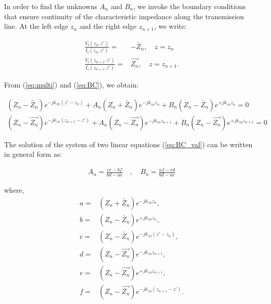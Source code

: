 \documentclass[11pt]{article}
\renewcommand{\^}{\hat}  %
\begin{document}
    In order to find the unknowns $A_n$ and $B_n$, we invoke the boundary conditions that ensure continuity of the characteristic impedance along the transmission line. At the left edge $z_n$ and the right edge $z_{n+1}$, we write:

    \begin{subequations}
      \begin{align}
        \frac{V_i(z_n,z')}{I_i(z_n,z')} ={}& -\overleftarrow{Z_n} , \quad z = z_n
        \label{eq:BC_left}\\
        \frac{V_i(z_{n+1},z')}{I_i(z_{n+1},z')} ={}& \overrightarrow{Z_n} ,\quad  z = z_{n+1}.
        \label{eq:BC_right}
      \end{align}
      \label{eq:BC}
    \end{subequations}

    From (\ref{eq:multi}) and (\ref{eq:BC}), we obtain:

    \begin{subequations}
      \begin{align}
        \left( Z_n - \overleftarrow{Z_n} \right) e^{-j k_{zn} (z' - z_n) } +  A_n\left( Z_n + \overleftarrow{Z_n} \right) e^{-j k_{zn} z_n } +
        B_n\left( Z_n - \overleftarrow{Z_n} \right) e^{+j k_{zn} z_n } = 0
        \label{eq:BC_at_left}\\
        \left( Z_n - \overrightarrow{Z_n} \right) e^{-j k_{zn} (z_{n+1} - z') } +  A_n\left( Z_n - \overrightarrow{Z_n} \right) e^{-j k_{zn} z_{n+1} } +
        B_n \left( Z_n - \overrightarrow{Z_n} \right) e^{+j k_{zn} z_{n+1} } = 0
        \label{eq:BC_at_right}
      \end{align}
      \label{eq:BC_val}
    \end{subequations}

    The solution of the system of two linear equations (\ref{eq:BC_val}) can be written in general form as:

    \begin{align}
      A_n = \frac{ c e - b f }{bd - a e}\quad , \quad
      B_n = \frac{ a f - c d }{bd - a e}
      \label{eq:gen_sol}
    \end{align}

    where,
    \begin{subequations}
      \begin{align}
        a ={}& \left( Z_n + \overleftarrow{Z_n} \right) e^{-j k_{zn} z_n },\\
        b ={}& \left( Z_n - \overleftarrow{Z_n} \right) e^{+j k_{zn} z_n },\\
        c ={}& \left( Z_n - \overleftarrow{Z_n} \right) e^{-j k_{zn} (z' - z_n)},\\
        d ={}& \left( Z_n - \overrightarrow{Z_n} \right) e^{-j k_{zn} z_{n+1} },\\
        e ={}& \left( Z_n - \overrightarrow{Z_n} \right) e^{+j k_{zn} z_{n+1} },\\
        f ={}& \left( Z_n - \overrightarrow{Z_n} \right) e^{-j k_{zn} (z_{n+1} - z') }.
        \label{eq:terms}
      \end{align}
    \end{subequations}
\end{document}

